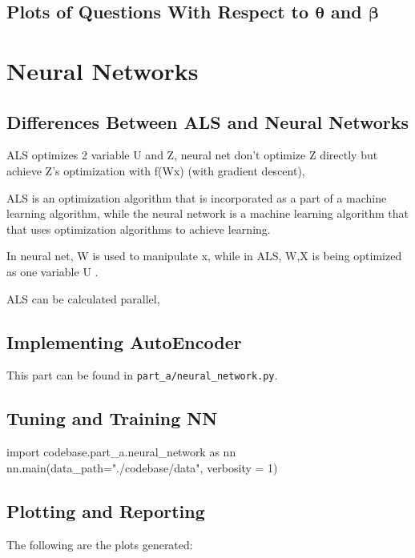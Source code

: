 \documentclass{article}
\begin{document}
    \subsection{Plots of Questions With Respect to $\bm{\theta}$ and $\bm{\beta}$}


    \pagebreak

    \section{Neural Networks}
    \subsection{Differences Between ALS and Neural Networks}
    
    ALS optimizes 2 variable U and Z, neural net don't optimize Z directly but achieve Z's optimization with f(Wx) (with gradient descent),

    ALS is an optimization algorithm that is incorporated as a part of a machine learning algorithm, while the neural network is a machine learning algorithm that that uses optimization algorithms to achieve learning.

    In neural net, W is used to manipulate x, while in ALS, W,X is being optimized as one variable U .

    ALS can be calculated parallel,

    \subsection{Implementing AutoEncoder}
    This part can be found in \verb|part_a/neural_network.py|.

    \subsection{Tuning and Training NN}
    \begin{pylabblock}
        import codebase.part_a.neural_network as nn
        nn.main(data_path="./codebase/data", verbosity = 1)
    \end{pylabblock}
    \printpythontex[verb]

    \subsection{Plotting and Reporting}
    The following are the plots generated:
\end{document}
